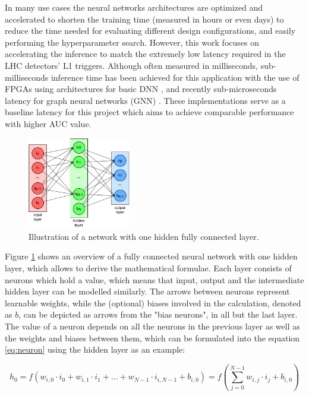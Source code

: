 In many use cases the neural networks architectures are optimized and accelerated to shorten the training time (measured in hours or even days) to reduce the time needed for evaluating different design configurations, and easily performing the hyperparameter search. However, this work focuses on accelerating the inference to match the extremely low latency required in the LHC detectors' L1 triggers. Although often measured in milliseconds, sub-milliseconds inference time has been achieved for this application with the use of FPGAs using architectures for basic DNN \cite{36-kreinar2018fast}, and recently sub-microseconds latency for graph neural networks (GNN) \cite{42-kreinar2020distance-weighted, 41-elabd2021graph}. These implementations serve as a baseline latency for this project which aims to achieve comparable performance with higher AUC value.

\begin{figure}[hpt!]
  \centering
  \includegraphics[trim={0cm 0cm 0cm 0cm}, width=0.4\textwidth, center]{background/fully_connected_layer.pdf}
  \caption{Illustration of a network with one hidden fully connected layer.}
  \label{fig:fully-connected-layer}
\end{figure}

Figure \ref{fig:fully-connected-layer} shows an overview of a fully connected neural network with one hidden layer, which allows to derive the mathematical formulae. Each layer consists of neurons which hold a value, which means that input, output and the intermediate hidden layer can be modelled similarly. The arrows between neurons represent learnable weights, while the (optional) biases involved in the calculation, denoted as \(b\), can be depicted as arrows from the "bias neurons", in all but the last layer. The value of a neuron depends on all the neurons in the previous layer as well as the weights and biases between them, which can be formulated into the equation \ref{eq:neuron} using the hidden layer as an example:

\begin{equation}\label{eq:neuron}
  h_0 = f ( w_{i, 0} \cdot i_0 + w_{i, 1} \cdot i_1 + \hdots + w_{N-1} \cdot i_{i, N-1} + b_{i, 0} )
  = f ( \sum_{j=0}^{N-1} w_{i, j} \cdot i_j + b_{i, 0} )
\end{equation}

